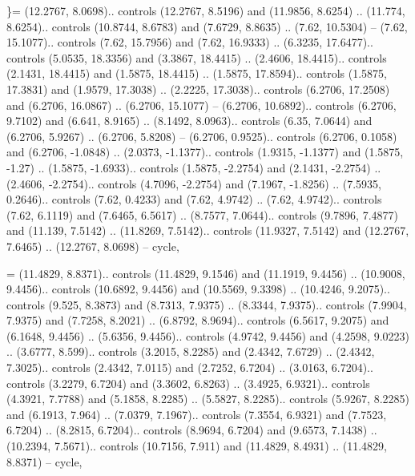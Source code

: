 \}= {(12.2767, 8.0698).. controls (12.2767, 8.5196) and (11.9856, 8.6254) .. (11.774, 8.6254).. controls (10.8744, 8.6783) and (7.6729, 8.8635) .. (7.62, 10.5304) -- (7.62, 15.1077).. controls (7.62, 15.7956) and (7.62, 16.9333) .. (6.3235, 17.6477).. controls (5.0535, 18.3356) and (3.3867, 18.4415) .. (2.4606, 18.4415).. controls (2.1431, 18.4415) and (1.5875, 18.4415) .. (1.5875, 17.8594).. controls (1.5875, 17.3831) and (1.9579, 17.3038) .. (2.2225, 17.3038).. controls (6.2706, 17.2508) and (6.2706, 16.0867) .. (6.2706, 15.1077) -- (6.2706, 10.6892).. controls (6.2706, 9.7102) and (6.641, 8.9165) .. (8.1492, 8.0963).. controls (6.35, 7.0644) and (6.2706, 5.9267) .. (6.2706, 5.8208) -- (6.2706, 0.9525).. controls (6.2706, 0.1058) and (6.2706, -1.0848) .. (2.0373, -1.1377).. controls (1.9315, -1.1377) and (1.5875, -1.27) .. (1.5875, -1.6933).. controls (1.5875, -2.2754) and (2.1431, -2.2754) .. (2.4606, -2.2754).. controls (4.7096, -2.2754) and (7.1967, -1.8256) .. (7.5935, 0.2646).. controls (7.62, 0.4233) and (7.62, 4.9742) .. (7.62, 4.9742).. controls (7.62, 6.1119) and (7.6465, 6.5617) .. (8.7577, 7.0644).. controls (9.7896, 7.4877) and (11.139, 7.5142) .. (11.8269, 7.5142).. controls (11.9327, 7.5142) and (12.2767, 7.6465) .. (12.2767, 8.0698) -- cycle},

\ctptilde = {(11.4829, 8.8371).. controls (11.4829, 9.1546) and (11.1919, 9.4456) .. (10.9008, 9.4456).. controls (10.6892, 9.4456) and (10.5569, 9.3398) .. (10.4246, 9.2075).. controls (9.525, 8.3873) and (8.7313, 7.9375) .. (8.3344, 7.9375).. controls (7.9904, 7.9375) and (7.7258, 8.2021) .. (6.8792, 8.9694).. controls (6.5617, 9.2075) and (6.1648, 9.4456) .. (5.6356, 9.4456).. controls (4.9742, 9.4456) and (4.2598, 9.0223) .. (3.6777, 8.599).. controls (3.2015, 8.2285) and (2.4342, 7.6729) .. (2.4342, 7.3025).. controls (2.4342, 7.0115) and (2.7252, 6.7204) .. (3.0163, 6.7204).. controls (3.2279, 6.7204) and (3.3602, 6.8263) .. (3.4925, 6.9321).. controls (4.3921, 7.7788) and (5.1858, 8.2285) .. (5.5827, 8.2285).. controls (5.9267, 8.2285) and (6.1913, 7.964) .. (7.0379, 7.1967).. controls (7.3554, 6.9321) and (7.7523, 6.7204) .. (8.2815, 6.7204).. controls (8.9694, 6.7204) and (9.6573, 7.1438) .. (10.2394, 7.5671).. controls (10.7156, 7.911) and (11.4829, 8.4931) .. (11.4829, 8.8371) -- cycle},

